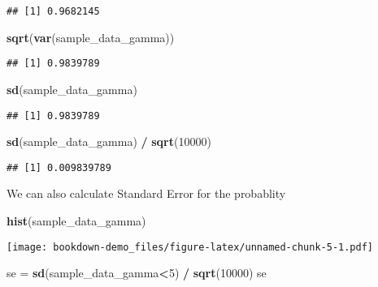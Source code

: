\documentclass[]{book}
\newenvironment{Shaded}{\begin{snugshade}}{\end{snugshade}}
\newcommand{\KeywordTok}[1]{\textcolor[rgb]{0.13,0.29,0.53}{\textbf{#1}}}
\newcommand{\DecValTok}[1]{\textcolor[rgb]{0.00,0.00,0.81}{#1}}
\newcommand{\StringTok}[1]{\textcolor[rgb]{0.31,0.60,0.02}{#1}}
\newcommand{\OperatorTok}[1]{\textcolor[rgb]{0.81,0.36,0.00}{\textbf{#1}}}
\newcommand{\NormalTok}[1]{#1}
\begin{document}
\begin{verbatim}
## [1] 0.9682145
\end{verbatim}

\begin{Shaded}
\begin{Highlighting}[]
\KeywordTok{sqrt}\NormalTok{(}\KeywordTok{var}\NormalTok{(sample_data_gamma))}
\end{Highlighting}
\end{Shaded}

\begin{verbatim}
## [1] 0.9839789
\end{verbatim}

\begin{Shaded}
\begin{Highlighting}[]
\KeywordTok{sd}\NormalTok{(sample_data_gamma) }
\end{Highlighting}
\end{Shaded}

\begin{verbatim}
## [1] 0.9839789
\end{verbatim}

\begin{Shaded}
\begin{Highlighting}[]
\KeywordTok{sd}\NormalTok{(sample_data_gamma) }\OperatorTok{/}\StringTok{ }\KeywordTok{sqrt}\NormalTok{(}\DecValTok{10000}\NormalTok{)}
\end{Highlighting}
\end{Shaded}

\begin{verbatim}
## [1] 0.009839789
\end{verbatim}

We can also calculate Standard Error for the probablity

\begin{Shaded}
\begin{Highlighting}[]
\KeywordTok{hist}\NormalTok{(sample_data_gamma)}
\end{Highlighting}
\end{Shaded}

\texttt{[image: bookdown-demo\_files/figure-latex/unnamed-chunk-5-1.pdf]}

\begin{Shaded}
\begin{Highlighting}[]
\NormalTok{se =}\StringTok{ }\KeywordTok{sd}\NormalTok{(sample_data_gamma}\OperatorTok{<}\DecValTok{5}\NormalTok{) }\OperatorTok{/}\StringTok{ }\KeywordTok{sqrt}\NormalTok{(}\DecValTok{10000}\NormalTok{)}
\NormalTok{se}
\end{Highlighting}
\end{Shaded}
\end{document}
